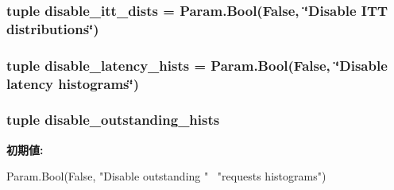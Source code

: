 \hypertarget{classCommMonitor_1_1CommMonitor_a97029e2c702b1aee04a803c6ec896d43}{
\subsubsection[{disable\_\-itt\_\-dists}]{\setlength{\rightskip}{0pt plus 5cm}tuple {\bf disable\_\-itt\_\-dists} = Param.Bool(False, \char`\"{}Disable ITT distributions\char`\"{})}}
\label{classCommMonitor_1_1CommMonitor_a97029e2c702b1aee04a803c6ec896d43}
\hypertarget{classCommMonitor_1_1CommMonitor_a940041883f4c619b92e2dab3feac5952}{
\subsubsection[{disable\_\-latency\_\-hists}]{\setlength{\rightskip}{0pt plus 5cm}tuple {\bf disable\_\-latency\_\-hists} = Param.Bool(False, \char`\"{}Disable latency histograms\char`\"{})}}
\label{classCommMonitor_1_1CommMonitor_a940041883f4c619b92e2dab3feac5952}
\hypertarget{classCommMonitor_1_1CommMonitor_a1d030c4765b3eea029b7e3666483c9d2}{
\subsubsection[{disable\_\-outstanding\_\-hists}]{\setlength{\rightskip}{0pt plus 5cm}tuple {\bf disable\_\-outstanding\_\-hists}}}
\label{classCommMonitor_1_1CommMonitor_a1d030c4765b3eea029b7e3666483c9d2}
{\bfseries 初期値:}
\begin{DoxyCode}
Param.Bool(False, "Disable outstanding " \
                                               "requests histograms")
\end{DoxyCode}
